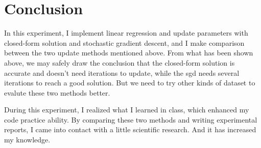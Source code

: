 \documentclass[journal, a4paper]{IEEEtran}
\begin{document}
\section{Conclusion}

In this experiment, I implement linear regression and update parameters with closed-form solution and stochastic gradient descent, and I make comparison between the two update methods mentioned above. From what has been shown above, we may safely draw the conclusion that the closed-form solution is accurate and doesn't need iterations to update, while the sgd needs several iterations to reach a good solution. But we need to try other kinds of dataset to evalute these two methods better.

During this experiment, I realized what I learned in class, which enhanced my code practice ability. By comparing these two methods and writing experimental reports, I came into contact with a little scientific research. And it has increased my knowledge.

\end{document}
